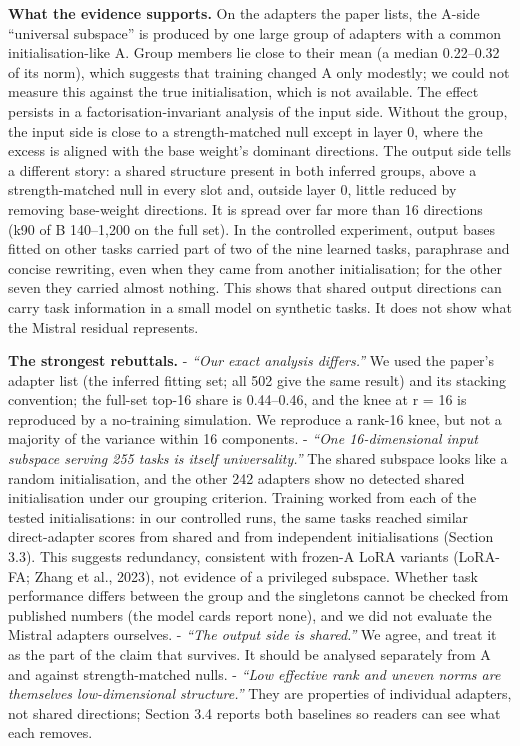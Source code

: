 \documentclass[
  11pt,
]{article}
\newcounter{none} %
\begin{document}
\textbf{What the evidence supports.} On the adapters the paper lists,
the A-side ``universal subspace'' is produced by one large group of
adapters with a common initialisation-like A. Group members lie close to
their mean (a median 0.22--0.32 of its norm), which suggests that
training changed A only modestly; we could not measure this against the
true initialisation, which is not available. The effect persists in a
factorisation-invariant analysis of the input side. Without the group,
the input side is close to a strength-matched null except in layer 0,
where the excess is aligned with the base weight's dominant directions.
The output side tells a different story: a shared structure present in
both inferred groups, above a strength-matched null in every slot and,
outside layer 0, little reduced by removing base-weight directions. It
is spread over far more than 16 directions (k90 of B 140--1,200 on the
full set). In the controlled experiment, output bases fitted on other
tasks carried part of two of the nine learned tasks, paraphrase and
concise rewriting, even when they came from another initialisation; for
the other seven they carried almost nothing. This shows that shared
output directions can carry task information in a small model on
synthetic tasks. It does not show what the Mistral residual represents.

\textbf{The strongest rebuttals.} - \emph{``Our exact analysis
differs.''} We used the paper's adapter list (the inferred fitting set;
all 502 give the same result) and its stacking convention; the full-set
top-16 share is 0.44--0.46, and the knee at r = 16 is reproduced by a
no-training simulation. We reproduce a rank-16 knee, but not a majority
of the variance within 16 components. - \emph{``One 16-dimensional input
subspace serving 255 tasks is itself universality.''} The shared
subspace looks like a random initialisation, and the other 242 adapters
show no detected shared initialisation under our grouping criterion.
Training worked from each of the tested initialisations: in our
controlled runs, the same tasks reached similar direct-adapter scores
from shared and from independent initialisations (Section 3.3). This
suggests redundancy, consistent with frozen-A LoRA variants (LoRA-FA;
Zhang et al., 2023), not evidence of a privileged subspace. Whether task
performance differs between the group and the singletons cannot be
checked from published numbers (the model cards report none), and we did
not evaluate the Mistral adapters ourselves. - \emph{``The output side
is shared.''} We agree, and treat it as the part of the claim that
survives. It should be analysed separately from A and against
strength-matched nulls. - \emph{``Low effective rank and uneven norms
are themselves low-dimensional structure.''} They are properties of
individual adapters, not shared directions; Section 3.4 reports both
baselines so readers can see what each removes.
\end{document}
